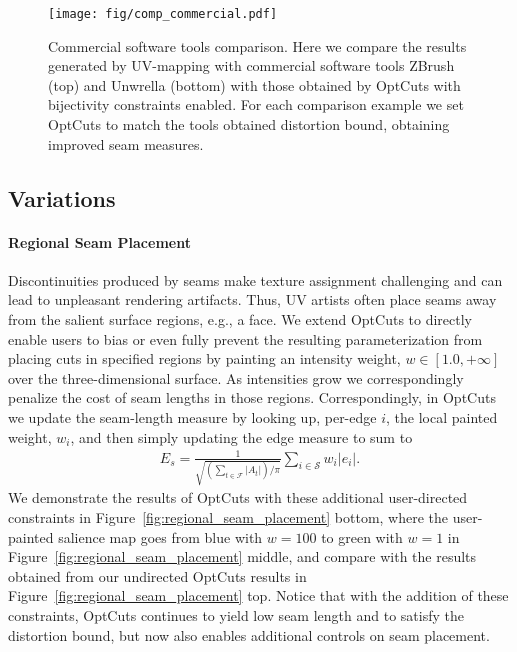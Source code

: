 \begin{figure}[t]
\centering
\texttt{[image: fig/comp\_commercial.pdf]}
\caption{Commercial software tools comparison. Here we compare the results generated by UV-mapping with commercial software tools ZBrush (top) and Unwrella (bottom) with those obtained by OptCuts with bijectivity constraints enabled. For each comparison example we set OptCuts to match the tools obtained distortion bound, obtaining improved seam measures.
}
\label{fig:comp_commercial}
\end{figure}


\subsection{Variations}
\label{sec:var}
\paragraph{Regional Seam Placement}
Discontinuities produced by seams make texture assignment challenging and can lead to unpleasant rendering artifacts. Thus, UV artists often place seams away from the salient surface regions, e.g., a face. We extend OptCuts to directly enable users to bias or even fully prevent the resulting parameterization from placing cuts in specified regions by painting an intensity weight, $w \in [1.0, +\infty]$ over the three-dimensional surface. As intensities grow we correspondingly penalize the cost of seam lengths in those regions. Correspondingly, in OptCuts we update the seam-length measure by looking up, per-edge $i$, the local painted weight, $w_{i}$, and then simply updating the edge measure to sum to 
\begin{align}
E_s = \frac{1}{\sqrt{(\sum_{t\in\mathcal{F}} |A_t|)/\pi}} \sum_{i \in \mathcal{S}} w_i |e_i|.
\end{align}
%
We demonstrate the results of OptCuts with these additional user-directed constraints in Figure~\ref{fig:regional_seam_placement} bottom, where the user-painted salience map goes from blue with $w = 100$ to green with $w = 1$ in Figure~\ref{fig:regional_seam_placement} middle, and compare with the results obtained from our undirected OptCuts results in Figure~\ref{fig:regional_seam_placement} top. Notice that with the addition of these constraints, OptCuts continues to yield low seam length and to satisfy the distortion bound, but now also enables additional controls on seam placement.
 
